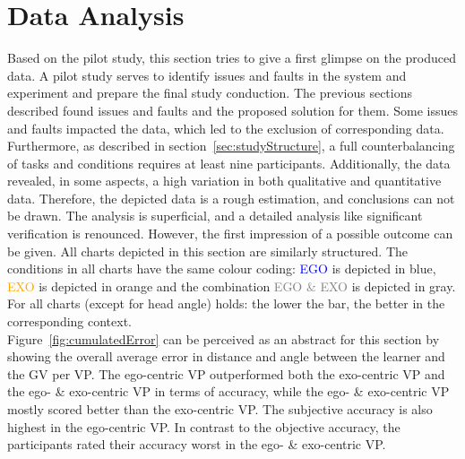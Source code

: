\section{Data Analysis}
\label{sec:evalDataAna}
Based on the pilot study, this section tries to give a first glimpse on the produced data. A pilot study serves to identify issues and faults in the system and experiment and prepare the final study conduction. The previous sections described found issues and faults and the proposed solution for them. Some issues and faults impacted the data, which led to the exclusion of corresponding data. Furthermore, as described in section~\ref{sec:studyStructure}, a full counterbalancing of tasks and conditions requires at least nine participants. Additionally, the data revealed, in some aspects, a high variation in both qualitative and quantitative data. Therefore, the depicted data is a rough estimation, and conclusions can not be drawn. The analysis is superficial, and a detailed analysis like significant verification is renounced. However, the first impression of a possible outcome can be given. All charts depicted in this section are similarly structured. The conditions in all charts have the same colour coding: \textcolor{blue}{EGO} is depicted in blue, \textcolor{orange}{EXO} is depicted in orange and the combination \textcolor{gray}{EGO \& EXO} is depicted in gray. For all charts (except for head angle) holds: the lower the bar, the better in the corresponding context.\\
Figure~\ref{fig:cumulatedError} can be perceived as an abstract for this section by showing the overall average error in distance and angle between the learner and the GV per VP. The ego-centric VP outperformed both the exo-centric VP and the ego- \& exo-centric VP in terms of accuracy, while the ego- \& exo-centric VP mostly scored better than the exo-centric VP. The subjective accuracy is also highest in the ego-centric VP. In contrast to the objective accuracy, the participants rated their accuracy worst in the ego- \& exo-centric VP.

